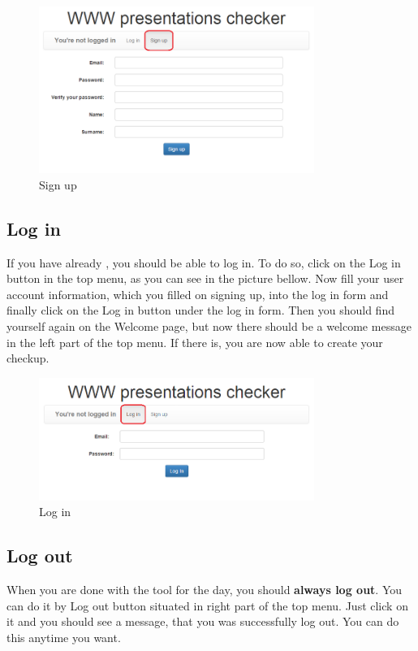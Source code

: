 \documentclass[12pt,a4paper]{article}
\begin{document}
\begin{figure}[H]
    \centering
    \includegraphics[width=0.8\textwidth]{pictures/signup.png}
		\caption{Sign up}
		\label{fig:signup}
\end{figure}

\subsection{Log in} \label{login}
If you have already , you should be able to log in. To do so, click on the Log in button in the top menu, as you can see in the picture bellow. Now fill your user account information, which you filled on signing up, into the log in form and finally click on the Log in button under the log in form. Then you should find yourself again on the Welcome page, but now there should be a welcome message in the left part of the top menu. If there is, you are now able to create your checkup.

\begin{figure}[H]
    \centering
    \includegraphics[width=0.8\textwidth]{pictures/login.png}
		\caption{Log in}
		\label{fig:login}
\end{figure}

\subsection{Log out} \label{logout}
When you are done with the tool for the day, you should \textbf{always log out}. You can do it by Log out button situated in right part of the top menu. Just click on it and you should see a message, that you was successfully log out. You can do this anytime you want.
\end{document}
